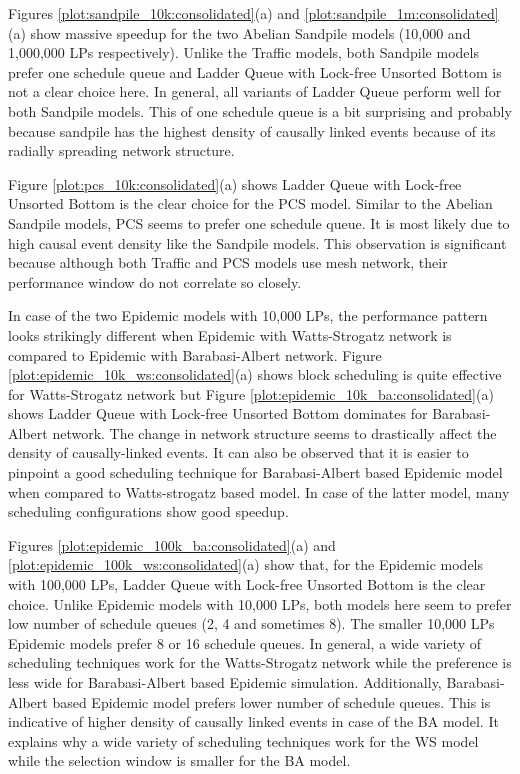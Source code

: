 \documentclass[11pt]{book}
\begin{document}
Figures \ref{plot:sandpile_10k:consolidated}(a) and \ref{plot:sandpile_1m:consolidated}(a) show
massive speedup for the two Abelian Sandpile models (10,000 and 1,000,000 LPs respectively). Unlike
the Traffic models, both Sandpile models prefer one schedule queue and Ladder Queue with Lock-free
Unsorted Bottom is not a clear choice here. In general, all variants of Ladder Queue perform well
for both Sandpile models. This  of one schedule queue is a bit surprising and probably because
sandpile has the highest density of causally linked events because of its radially spreading network
structure.

Figure \ref{plot:pcs_10k:consolidated}(a) shows Ladder Queue with Lock-free Unsorted Bottom is the
clear choice for the PCS model. Similar to the Abelian Sandpile models, PCS seems to prefer one
schedule queue. It is most likely due to high causal event density like the Sandpile models. This
observation is significant because although both Traffic and PCS models use mesh network, their
performance window do not correlate so closely.

In case of the two Epidemic models with 10,000 LPs, the performance pattern looks strikingly
different when Epidemic with Watts-Strogatz network is compared to Epidemic with Barabasi-Albert
network. Figure \ref{plot:epidemic_10k_ws:consolidated}(a) shows block scheduling is quite effective
for Watts-Strogatz network but Figure \ref{plot:epidemic_10k_ba:consolidated}(a) shows Ladder Queue
with Lock-free Unsorted Bottom dominates for Barabasi-Albert network. The change in network structure
seems to drastically affect the density of causally-linked events. It can also be observed that it
is easier to pinpoint a good scheduling technique for Barabasi-Albert based Epidemic model when
compared to Watts-strogatz based model. In case of the latter model, many scheduling configurations
show good speedup.

Figures \ref{plot:epidemic_100k_ba:consolidated}(a) and \ref{plot:epidemic_100k_ws:consolidated}(a)
show that, for the Epidemic models with 100,000 LPs, Ladder Queue with Lock-free Unsorted Bottom is
the clear choice. Unlike Epidemic models with 10,000 LPs, both models here seem to prefer low number
of schedule queues (2, 4 and sometimes 8). The smaller 10,000 LPs Epidemic models prefer 8 or 16
schedule queues. In general, a wide variety of scheduling techniques work for the Watts-Strogatz
network while the preference is less wide for Barabasi-Albert based Epidemic simulation. Additionally,
Barabasi-Albert based Epidemic model prefers lower number of schedule queues. This is indicative of
higher density of causally linked events in case of the BA model. It explains why a wide variety of
scheduling techniques work for the WS model while the selection window is smaller for the BA model.
\end{document}

